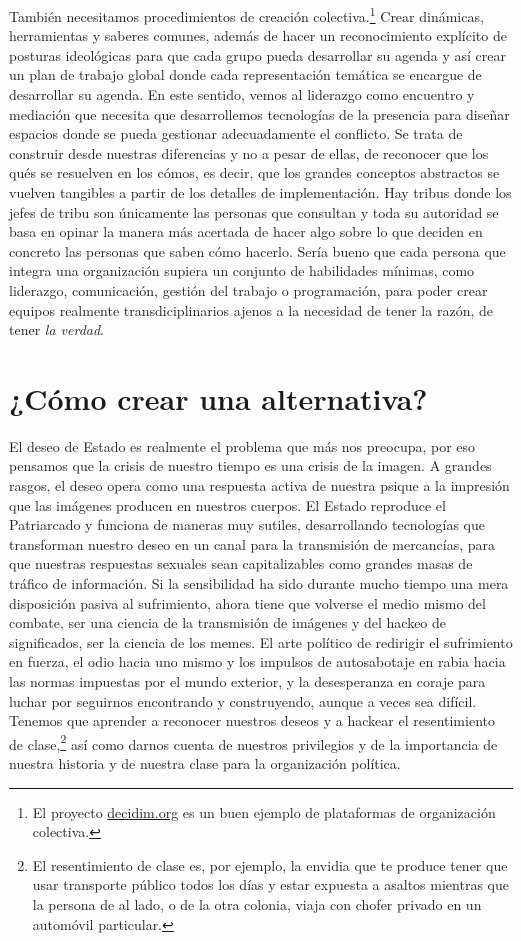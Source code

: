 También necesitamos procedimientos de creación colectiva.\footnote{El proyecto \url{decidim.org} es un buen ejemplo de plataformas de organización colectiva.} Crear dinámicas, herramientas y saberes comunes, además de hacer un reconocimiento explícito de posturas ideológicas para que cada grupo pueda desarrollar su agenda y así crear un plan de trabajo global donde cada representación temática se encargue de desarrollar su agenda. En este sentido, vemos al liderazgo como encuentro y mediación que necesita que desarrollemos tecnologías de la presencia para diseñar espacios donde se pueda gestionar adecuadamente el conflicto. Se trata de construir desde nuestras diferencias y no a pesar de ellas, de reconocer que los qués se resuelven en los cómos, es decir, que los grandes conceptos abstractos se vuelven tangibles a partir de los detalles de implementación. Hay tribus donde los jefes de tribu son únicamente las personas que consultan y toda su autoridad se basa en opinar la manera más acertada de hacer algo sobre lo que deciden en concreto las personas que saben cómo hacerlo. Sería bueno que cada persona que integra una organización supiera un conjunto de habilidades mínimas, como liderazgo, comunicación, gestión del trabajo o programación, para poder crear equipos realmente transdiciplinarios ajenos a la necesidad de tener la razón, de tener \emph{la verdad}.

\section{¿Cómo crear una alternativa?}
\label{sec:alternativa}

El deseo de Estado es realmente el problema que más nos preocupa, por eso pensamos que la crisis de nuestro tiempo es una crisis de la imagen. A grandes rasgos, el deseo opera como una respuesta activa de nuestra psique a la impresión que las imágenes producen en nuestros cuerpos. El Estado reproduce el Patriarcado y funciona de maneras muy sutiles, desarrollando tecnologías que transforman nuestro deseo en un canal para la transmisión de mercancías, para que nuestras respuestas sexuales sean capitalizables como grandes masas de tráfico de información. Si la sensibilidad ha sido durante mucho tiempo una mera disposición pasiva al sufrimiento, ahora tiene que volverse el medio mismo del combate, ser una ciencia de la transmisión de imágenes y del hackeo de significados, ser la ciencia de los memes. El arte político de redirigir el sufrimiento en fuerza, el odio hacia uno mismo y los impulsos de autosabotaje en rabia hacia las normas impuestas por el mundo exterior, y la desesperanza en coraje para luchar por seguirnos encontrando y construyendo, aunque a veces sea difícil. Tenemos que aprender a reconocer nuestros deseos y a hackear el resentimiento de clase,\footnote{El resentimiento de clase es, por ejemplo, la envidia que te produce tener que usar transporte público todos los días y estar expuesta a asaltos mientras que la persona de al lado, o de la otra colonia, viaja con chofer privado en un automóvil particular.} así como darnos cuenta de nuestros privilegios y de la importancia de nuestra historia y de nuestra clase para la organización política.


